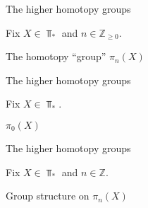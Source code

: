 \begin{frame}[t]{The higher homotopy groups} %

  \par Fix $X \in \Top_{*}$ and $n \in \mathbb{Z}_{\geq 0}$.
  \par{} The homotopy ``group'' $\pi_n (X)$
  
\end{frame}

\begin{frame}[t]{The higher homotopy groups} %

  \par Fix $X \in \Top_{*}$.
  \par{} $\pi_0 (X)$
  
\end{frame}

\begin{frame}[t]{The higher homotopy groups} %

  \par Fix $X \in \Top_{*}$ and $n \in \mathbb{Z}$. 
  \par{} Group structure on $\pi_n (X)$
  
\end{frame}
